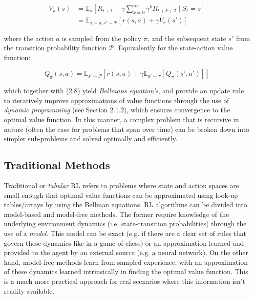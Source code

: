 \documentclass[12pt,twoside]{report}
\begin{document}
\begin{equation}
\begin{split}
       V_\pi(s) &  = \mathbb{E}_{\pi}\left[R_{t+1} + \gamma \sum_{k=0}^\infty \gamma^k R_{t+k+2} \! \mid \! S_t = s \right] \\
       & = \mathbb{E}_{a \sim \pi, s' \sim \mathcal{P}}\left[r(s,a) + \gamma V_\pi(s') \right]
\end{split}
\end{equation}

\noindent where the action $a$ is sampled from the policy $\pi$, and the subsequent state $s'$ from the transition probability function $\mathcal{P}$. Equivalently for the state-action value function: 

\begin{equation}
    Q_\pi(s,a) = \mathbb{E}_{s' \sim \mathcal{P}} \left[r(s,a) + \gamma  \mathbb{E}_{a' \sim \pi} \left[Q_\pi(s',a')\right] \right]
\end{equation}

\noindent which together with (2.8) yield \textit{Bellmans equation's}, and provide an update rule to iteratively improve approximations of value functions through the use of \textit{dynamic programming} \cite{bellman_1958} (see Section 2.1.2), which ensures convergence to the optimal value function. In this manner, a complex problem that is recursive in nature (often the case for problems that span over time) can be broken down into simpler sub-problems and solved optimally and efficiently. 

\subsection{Traditional Methods}

Traditional or \textit{tabular} RL refers to problems where state and action spaces are small enough that optimal value functions can be approximated using look-up tables/arrays by using the Bellman equations. RL algorithms can be divided into model-based and model-free methods. The former require knowledge of the underlying environment dynamics (i.e. state-transition probabilities) through the use of a \textit{model}. This model can be exact (e.g. if there are a clear set of rules that govern these dynamics like in a game of chess) or an approximation learned and provided to the agent by an external source (e.g. a neural network). On the other hand, model-free methods learn from sampled experience, with an approximation of these dynamics learned intrinsically in finding the optimal value function. This is a much more practical approach for real scenarios where this information isn't readily available. 
\end{document}
